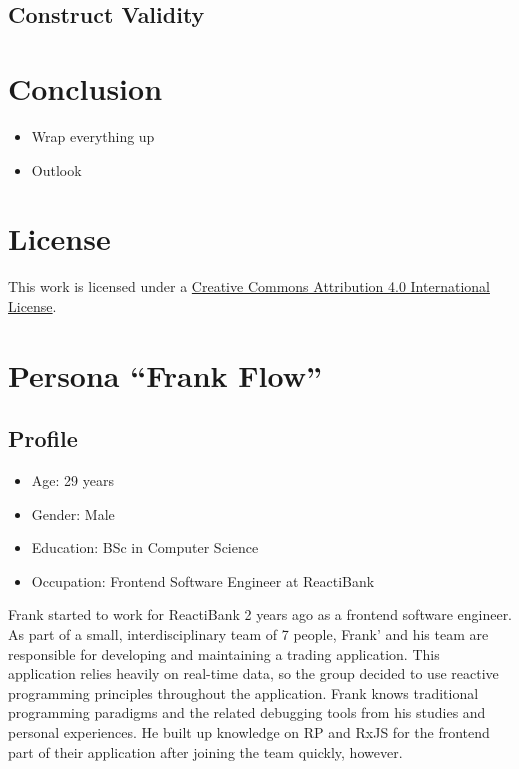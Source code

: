 \documentclass[sigplan,screen,nonacm,review]{acmart}
\begin{document}
\subsection{Construct Validity}

\section{Conclusion}
\label{sec:conclusion}

\begin{itemize}
	\item Wrap everything up
	\item Outlook
\end{itemize}


\section*{License}
\ccby\thinspace\thinspace This work is licensed under a \href{https://creativecommons.org/licenses/by/4.0/}{Creative Commons Attribution 4.0 International License}.

\appendix





\section{Persona ``Frank Flow''}
\label{sec:persona}

\subsection{Profile}
\begin{itemize}
	\item Age: 29 years
	\item Gender: Male
	\item Education: BSc in Computer Science
	\item Occupation: Frontend Software Engineer at ReactiBank
\end{itemize}

Frank started to work for ReactiBank 2 years ago as a frontend software engineer. As part of a small, interdisciplinary team of 7 people, Frank' and his team are responsible for developing and maintaining a trading application. This application relies heavily on real-time data, so the group decided to use reactive programming principles throughout the application. Frank knows traditional programming paradigms and the related debugging tools from his studies and personal experiences. He built up knowledge on RP and RxJS for the frontend part of their application after joining the team quickly, however.
\end{document}
